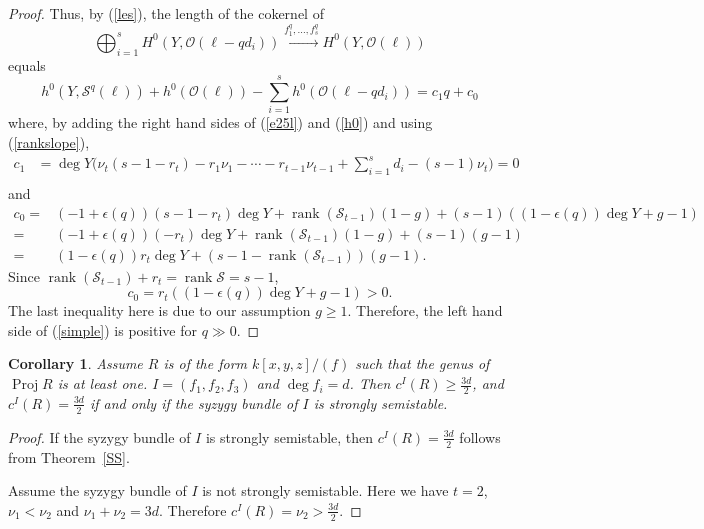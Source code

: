 \documentclass[draft]{amsart}
\newtheorem{cor}[theorem]{Corollary}
\theoremstyle{definition}
\numberwithin{equation}{theorem}
\begin{document}
\begin{proof}
Thus, by (\ref{les}), the length of the cokernel of 
\[\bigoplus_{i=1}^sH^0(Y, {\mathcal{O}}({\ell}-qd_i)) \stackrel{f_1^q
, \ldots, f_s^q} {\longrightarrow} H^0(Y, {\mathcal{O}}({\ell}))\]
equals
\begin{equation}\label{simple}
h^0(Y, {\mathcal{S}}^q({\ell}))+h^0({\mathcal{O}}({\ell}))-\sum_{i=1}^s h^0( {\mathcal{O}}({\ell}-qd_i))=c_1q+c_0
\end{equation}
where, by adding the right hand sides of (\ref{e25l}) and (\ref{h0}) and using (\ref{rankslope}), 
\begin{align*}
c_1&=\deg Y\bigg(\nu_t(s-1-r_t)-r_1\nu_1- \cdots - r_{t-1} \nu_{t-1}+\sum_{i=1}^s d_i-(s-1)\nu_t\bigg)=0\\
\end{align*}
and 
\begin{align*}
c_0=&(-1+{\epsilon(q)})(s-1-r_t)\deg Y+{\mathop{\mathrm{rank}}\nolimits}({\mathcal{S}}_{t-1})(1-g)+(s-1)((1-{\epsilon(q)})\deg Y +g-1)\\
=&(-1+{\epsilon(q)})(-r_t)\deg Y+{\mathop{\mathrm{rank}}\nolimits}({\mathcal{S}}_{t-1})(1-g)+(s-1)(g-1)\\
=&(1-{\epsilon(q)})r_t\deg Y+(s-1-{\mathop{\mathrm{rank}}\nolimits}({\mathcal{S}}_{t-1}))(g-1).
\end{align*}
Since ${\mathop{\mathrm{rank}}\nolimits}({\mathcal{S}}_{t-1})+r_t={\mathop{\mathrm{rank}}\nolimits}{\mathcal{S}}=s-1$,
$$c_0=r_t((1-{\epsilon(q)})\deg Y+g-1)>0.$$
The last inequality here is due to our assumption $g \geq 1$.
Therefore, the left hand side of (\ref{simple}) is positive for $q\gg0$.

\end{proof}

\begin{cor} \label{equiv}
Assume $R$ is of the form $k[x,y,z]/(f)$ such that the genus of ${\mathop{\mathrm{Proj}}\nolimits} R$ is at least one. $I=(f_1,f_2,f_3)$ and $\deg f_i=d$. Then $c^I(R) \geq \frac{3d}{2}$, and $c^I(R) = \frac{3d}{2}$ if and only if the syzygy bundle of $I$ is strongly semistable.  
\end{cor}

\begin{proof}
If the syzygy bundle of $I$ is strongly semistable, then $c^I(R) = \frac{3d}{2}$ follows from Theorem~\ref{SS}. 

Assume the syzygy bundle of $I$ is not strongly semistable. Here we have $t=2$, $\nu_1<\nu_2$ and $\nu_1+\nu_2=3d$. Therefore $c^I(R) =\nu_2 > \frac{3d}{2}$.
\end{proof}
\end{document}
